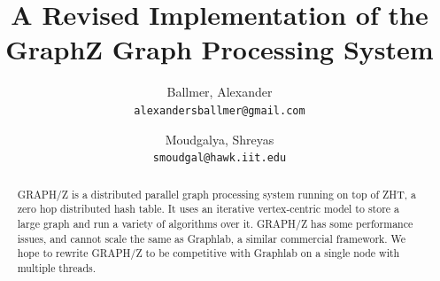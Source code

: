 \documentclass[10pt]{article}
\begin{document}
\nocite{Gz:1}
\nocite{Gz:2}
\nocite{Gz:3}
\nocite{Gz:4}
\nocite{Gz:5}
\title{A Revised Implementation of the GraphZ Graph Processing System}

\author{
  Ballmer, Alexander\\
  \texttt{alexandersballmer@gmail.com}
  \and
  Moudgalya, Shreyas\\
  \texttt{smoudgal@hawk.iit.edu}
  }

\maketitle

\begin{abstract}
  GRAPH/Z is a distributed parallel graph processing system running on top of ZHT, a zero hop distributed hash table. It uses an iterative vertex-centric model to store a large graph and run a variety of algorithms over it. GRAPH/Z has some performance issues, and cannot scale the same as Graphlab, a similar commercial framework. We hope to rewrite GRAPH/Z to be competitive with Graphlab on a single node with multiple threads.
\end{abstract}
\end{document}
